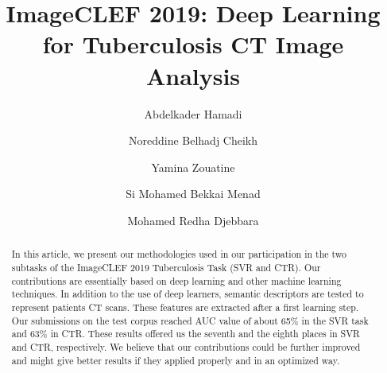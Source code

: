 \documentclass{llncs}
\begin{document}
%
\title{ImageCLEF 2019: Deep Learning for Tuberculosis CT Image Analysis}
%
%
\author{Abdelkader Hamadi \and Noreddine Belhadj Cheikh \and Yamina Zouatine \and Si Mohamed Bekkai Menad \and Mohamed Redha Djebbara}




%
%




%
\maketitle              %
%
\begin{abstract}
In this article, we present our methodologies used in our participation in the two subtasks of the ImageCLEF 2019 Tuberculosis Task (SVR and CTR). Our contributions are essentially based on deep learning and other machine learning techniques. In addition to the use of deep learners, semantic descriptors are tested to represent patients CT scans. These features are extracted after a first learning step. Our submissions on the test corpus reached AUC value of about 65\% in the SVR task and 63\% in CTR. These results offered us the seventh and the eighth places in SVR and CTR, respectively. We believe that our contributions could be further improved and might give better results if they applied properly and in an optimized way.

\end{abstract}  
%
%
%
\end{document}
